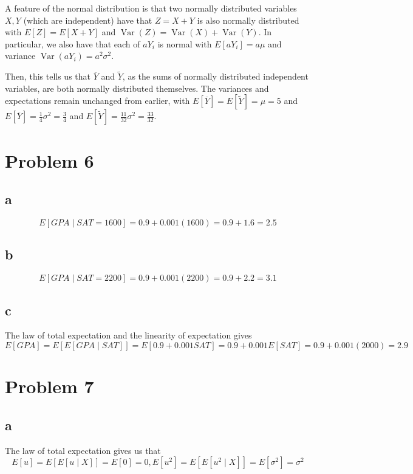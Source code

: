 \documentclass[12pt,letterpaper]{article}
\theoremstyle{definition}
\DeclareMathOperator{\Var}{Var}
\begin{document}
A feature of the normal distribution is that two normally distributed variables $X, Y$ (which are independent) have that $Z = X + Y$ is also normally distributed with $E[Z] = E[X + Y]$ and $\Var(Z) = \Var(X) + \Var(Y)$. In particular, we also have that each of $aY_i$ is normal with $E[aY_i] = a\mu$ and variance $\Var(aY_i) = a^2\sigma^2$.

Then, this tells us that $\overline{Y}$ and $\widetilde{Y}$, as the sums of normally distributed independent variables, are both normally distributed themselves. The variances and expectations remain unchanged from earlier, with $E[\overline{Y}] = E[\widetilde{Y}] = \mu = 5$ and $E[\overline{Y}] = \frac{1}{4}\sigma^2 = \frac{3}{4}$ and $E[\widetilde{Y}] = \frac{11}{32}\sigma^2 = \frac{33}{32}$.

\section*{Problem 6}
\subsection*{a}

\[
  E[GPA \mid SAT = 1600] = 0.9 + 0.001(1600) = 0.9 + 1.6 = 2.5
\]

\subsection*{b}

\[
  E[GPA \mid SAT = 2200] = 0.9 + 0.001(2200) = 0.9 + 2.2 = 3.1
\]

\subsection*{c}

The law of total expectation and the linearity of expectation gives
\[
  E[GPA] = E[E[GPA \mid SAT]] = E[0.9 + 0.001SAT] = 0.9 + 0.001E[SAT] = 0.9 + 0.001(2000) = 2.9
\]

\section*{Problem 7}
\subsection*{a}

The law of total expectation gives us that
\[
  E[u] = E[E[u \mid X]] = E[0] = 0, E[u^2] = E[E[u^2 \mid X]] = E[\sigma^2] = \sigma^2
\]
\end{document}
